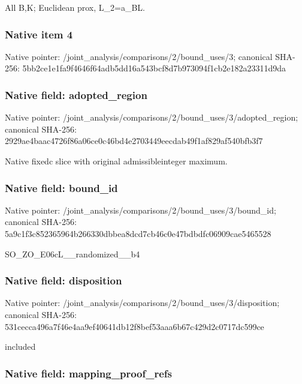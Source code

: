 \documentclass[10pt,a4paper]{article}
\begin{document}
All B,K; Euclidean prox, L\_2=a\_BL.


\subsubsection{Native item 4}


Native pointer: /joint\_analysis/comparis\allowbreak{}ons/2/bound\_uses/3; canonical SHA-256: 5bb2ce1e1fa9f4646f64adb5\allowbreak{}dd16a543bcf8d7b973094f1c\allowbreak{}b2e182a23311d9da



\subsubsection{Native field: adopted\_region}


Native pointer: /joint\_analysis/comparis\allowbreak{}ons/2/bound\_uses/3/adopt\allowbreak{}ed\_region; canonical SHA-256: 2929ae4baac4726f86a06ce0\allowbreak{}c46bd4e2703449eecdab49f1\allowbreak{}af829af540bfb3f7


Native fixedc slice with original admissibleinteger maximum.


\subsubsection{Native field: bound\_id}


Native pointer: /joint\_analysis/comparis\allowbreak{}ons/2/bound\_uses/3/bound\allowbreak{}\_id; canonical SHA-256: 5a9c1f3c852365964b266330\allowbreak{}dbbea8dcd7cb46c0e47bdbdf\allowbreak{}c06909cae5465528


SO\_ZO\_E06cL\_\_randomized\_\_b4


\subsubsection{Native field: disposition}


Native pointer: /joint\_analysis/comparis\allowbreak{}ons/2/bound\_uses/3/dispo\allowbreak{}sition; canonical SHA-256: 531cecca496a7f46e4aa9ef4\allowbreak{}0641db12f8bef53aaa6b67c4\allowbreak{}29d2c0717dc599ce


included


\subsubsection{Native field: mapping\_proof\_refs}
\end{document}
